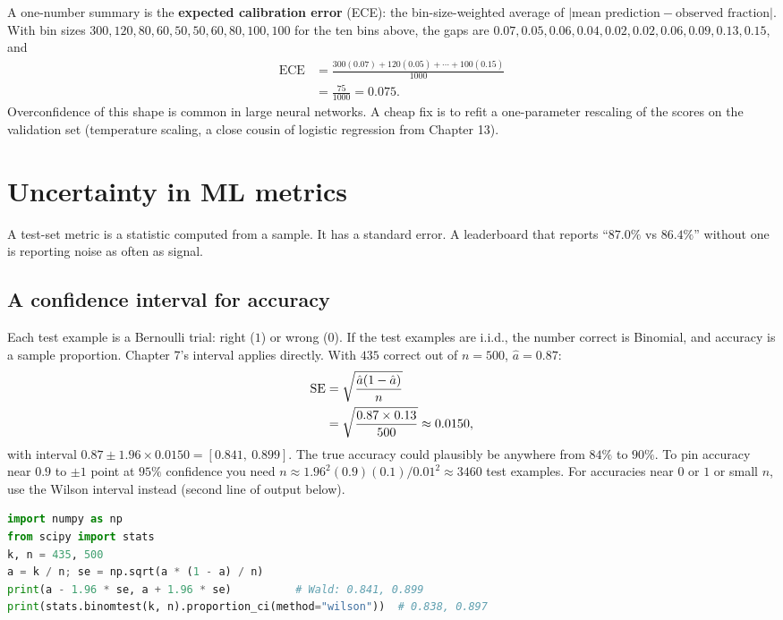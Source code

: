 A one-number summary is the \textbf{expected calibration error} (ECE): the bin-size-weighted
average of $|\text{mean prediction}-\text{observed fraction}|$. With bin sizes
$300,120,80,60,50,50,60,80,100,100$ for the ten bins above, the gaps are
$0.07,0.05,0.06,0.04,0.02,0.02,0.06,0.09,0.13,0.15$, and
\begin{align*}
\text{ECE} &= \frac{300(0.07)+120(0.05)+\cdots+100(0.15)}{1000} \\
&= \frac{75}{1000} = 0.075 .
\end{align*}
Overconfidence of this shape is common in large neural networks. A cheap fix is to refit a
one-parameter rescaling of the scores on the validation set (temperature scaling, a close cousin
of logistic regression from Chapter 13).

\section{Uncertainty in ML metrics}
\label{sec:ml-uncertainty}

A test-set metric is a statistic computed from a sample. It has a standard error. A
leaderboard that reports ``$87.0\%$ vs $86.4\%$'' without one is reporting noise as often as
signal.

\subsection{A confidence interval for accuracy}

Each test example is a Bernoulli trial: right ($1$) or wrong ($0$). If the test examples are
i.i.d., the number correct is Binomial, and accuracy is a sample proportion. Chapter 7's
interval applies directly. With $435$ correct out of $n=500$, $\hat a = 0.87$:
\begin{align*}
\operatorname{SE} &= \sqrt{\frac{\hat a(1-\hat a)}{n}} \\
&= \sqrt{\frac{0.87\times0.13}{500}} \approx 0.0150,
\end{align*}
with interval $0.87 \pm 1.96\times0.0150 = [0.841,\ 0.899]$.
The true accuracy could plausibly be anywhere from $84\%$ to $90\%$. To pin accuracy near
$0.9$ to $\pm1$ point at $95\%$ confidence you need
$n\approx 1.96^2(0.9)(0.1)/0.01^2\approx 3460$ test examples. For accuracies near $0$ or $1$
or small $n$, use the Wilson interval instead (second line of output below).

\begin{lstlisting}[language=Python]
import numpy as np
from scipy import stats
k, n = 435, 500
a = k / n; se = np.sqrt(a * (1 - a) / n)
print(a - 1.96 * se, a + 1.96 * se)          # Wald: 0.841, 0.899
print(stats.binomtest(k, n).proportion_ci(method="wilson"))  # 0.838, 0.897
\end{lstlisting}

